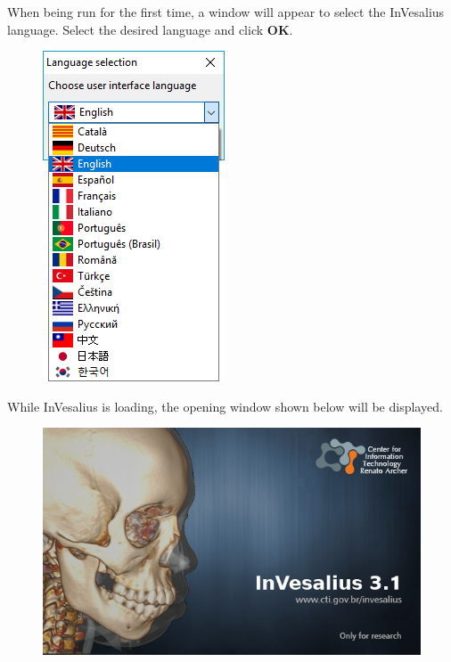 \hspace{.2cm}

When being run for the first time, a window will appear to select the InVesalius language. Select the desired language and click \textbf{OK}.

\begin{figure}[!htb]
\centering
\includegraphics[scale=0.6]{../user_guide_figures/invesalius_screen/invesalius_language_select_en.png}
\end{figure}

\newpage

While InVesalius is loading, the opening window shown below will be displayed.

\begin{figure}[!htb]
\centering
\includegraphics[scale=0.4]{../user_guide_figures/icons/splash_en.png}
\end{figure}

